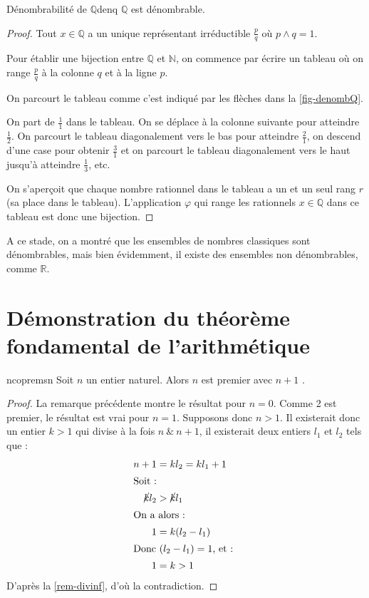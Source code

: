 \documentclass[a4paper,french,final]{memoir}
\begin{document}
\begin{theoremb}{Dénombrabilité de $\mathbb{Q}$}{denq}
	$\mathbb{Q}$ est dénombrable.
\end{theoremb}

\begin{proof}
	Tout $x \in \mathbb{Q}$ a un unique représentant irréductible $\frac{p}{q}$ où $p \wedge q = 1$. 
	
	Pour établir une bijection entre $\mathbb{Q}$ et $\mathbb{N}$, on commence par écrire un tableau où on range $\frac{p}{q}$ à la colonne $q$ et à la ligne $p$.  
	
	On parcourt le tableau comme c'est indiqué par les flèches dans la \cref{fig-denombQ}. 
	
	On part de $\frac{1}{1}$ dans le tableau. On se déplace à la colonne suivante pour atteindre $\frac{1}{2}$. On parcourt le tableau diagonalement vers le bas pour atteindre $\frac{2}{1}$, on descend d'une case pour obtenir $\frac{3}{1}$ et on parcourt le tableau diagonalement vers le haut jusqu'à atteindre $\frac{1}{3}$, etc. 
	
	On s'aperçoit que chaque nombre rationnel dans le tableau a un et un seul rang $r$ (sa place dans le tableau). L'application $\varphi$ qui range les rationnels $x \in \mathbb{Q}$ dans ce tableau est donc une bijection.
	
	 
\end{proof}
\diagdenomb

A ce stade, on a montré que les ensembles de nombres classiques sont dénombrables, mais bien évidemment, il existe des ensembles non dénombrables, comme $\mathbb{R}$. 


\nocite{*}
\printbibliography
\appendix 
\renewcommand{\thechapter}{A.\arabic{chapter}} %
\chapter{Démonstration du théorème fondamental de l'arithmétique}\label{annexe-thmfondarith}
\begin{lemmab}{}{ncopremsn}
  Soit $n$ un entier naturel. Alors $n$ est premier avec $n+1$ .
\end{lemmab}
\begin{proof}
La remarque précédente montre le résultat pour $n=0$. Comme 2 est premier, le résultat est vrai pour $n=1$. Supposons donc $n>1$. Il existerait donc un entier $k>1$ qui divise à la fois $n~\&~n+1$, il existerait deux entiers $l_1$ et $l_2$ tels que :  
\begin{align*}
  n+1& =kl_2=kl_{1}+1\\
\shortintertext{Soit~:} 
\cancel{k}l_2& >\cancel{k}l_1\\
\shortintertext{On a alors~:} 
1& =k(l_2-l_1)\\
\intertext{Donc $(l_2-l_1)= 1$, et : }
1& =k>1
\end{align*}
D'après la \cref{rem-divinf}, d'où la contradiction.
\end{proof}
\end{document}
